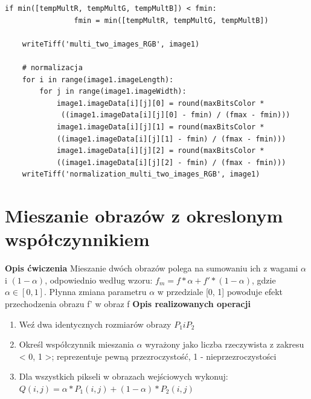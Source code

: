 \documentclass[magisterska,openany]{pracadypl}
\begin{document}
\begin{lstlisting}[caption={Mnożenie dwóch obrazów}]
            if min([tempMultR, tempMultG, tempMultB]) < fmin:
                fmin = min([tempMultR, tempMultG, tempMultB])

    writeTiff('multi_two_images_RGB', image1)

    # normalizacja
    for i in range(image1.imageLength):
        for j in range(image1.imageWidth):
            image1.imageData[i][j][0] = round(maxBitsColor *
             ((image1.imageData[i][j][0] - fmin) / (fmax - fmin)))
            image1.imageData[i][j][1] = round(maxBitsColor * 
            ((image1.imageData[i][j][1] - fmin) / (fmax - fmin)))
            image1.imageData[i][j][2] = round(maxBitsColor * 
            ((image1.imageData[i][j][2] - fmin) / (fmax - fmin)))
    writeTiff('normalization_multi_two_images_RGB', image1)

\end{lstlisting}
\newpage


\section{Mieszanie obrazów z okreslonym współczynnikiem}

\vspace{0.5cm}\textbf{\Large Opis ćwiczenia}
\vspace{0.25cm}\newline
Mieszanie dwóch obrazów polega na sumowaniu ich z wagami $\alpha$ i $(1-\alpha)$, odpowiednio
\newline według wzoru: $f_m=f*\alpha+f'*(1-\alpha)$, gdzie $\alpha\in[0,1]$. Płynna zmiana parametru $\alpha$ w przedziale [0, 1] powoduje efekt przechodzenia obrazu f' w obraz f
\newline
\newline
\textbf{\Large Opis realizowanych operacji}
\begin{enumerate}
\item Weź dwa identycznych rozmiarów obrazy $P_1 i P_2$
\item Określ współczynnik mieszania $\alpha$ wyrażony jako liczba rzeczywista z zakresu < 0, 1 >;  reprezentuje pewną przezroczystość, 1 - nieprzezroczystości
\item Dla wszystkich pikseli w obrazach wejściowych wykonuj: $Q(i,j)=\alpha*P_1(i,j)+(1-\alpha)*P_2(i,j)$
\end{enumerate}
\end{document}

